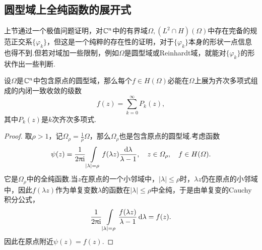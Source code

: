 \subsection{圆型域上全纯函数的展开式}
上节通过一个极值问题证明，对$\mathbb C^n$中的有界域$\Omega,(L^2\cap H)(\Omega)$中存在完备的规范正交系$\{\varphi_k\}$，但这是一个纯粹的存在性的证明，对于$\{\varphi_k\}$本身的形状一点信息也得不到.但若对域加一些限制，例如$\Omega$是圆型域或Reinhardt域，就能对$\{\varphi_k\}$的形状作出一些判断.
\begin{theorem}\label{thm3.2.1}
	设$\Omega$是$\mathbb C^n$中包含原点的圆型域，那么每个$f\in H(\Omega)$必能在$\Omega$上展为齐次多项式组成的内闭一致收敛的级数
	\[f(z)=\sum_{k=0}^{\infty} P_k(z),\]
	其中$P_k(z)$是$k$次齐次多项式.
\end{theorem}
\begin{proof}
	取$\rho>1$，记$\Omega_\rho=\frac1\rho \Omega$，那么$\Omega_\rho$也是包含原点的圆型域.考虑函数
	\[\psi(z)=\frac1{2\uppi\mathrm i}\int\limits_{|\lambda|=\rho}f(\lambda z)\frac{\mathop{}\!\mathrm{d}\lambda}{\lambda-1},\quad z\in\varOmega_\rho,\quad f\in H(\varOmega).\]
	它是$\Omega_\rho$中的全纯函数.当$z$在原点的一个小邻域中，$|\lambda|\le\rho$时，$\lambda z$仍在原点的小邻域中，因此$f(\lambda z)$作为单复变数$\lambda$的函数在$|\lambda|\le\rho$中全纯，于是由单复变的Cauchy积分公式，
	\[\frac1{2\uppi\mathrm i}\int\limits_{|\lambda|=\rho} \frac{f(\lambda z)}{\lambda-1}\mathop{}\!\mathrm{d}\lambda=f(z).\]
	因此在原点附近$\psi(z)=f(z)$.
	

\end{proof}
